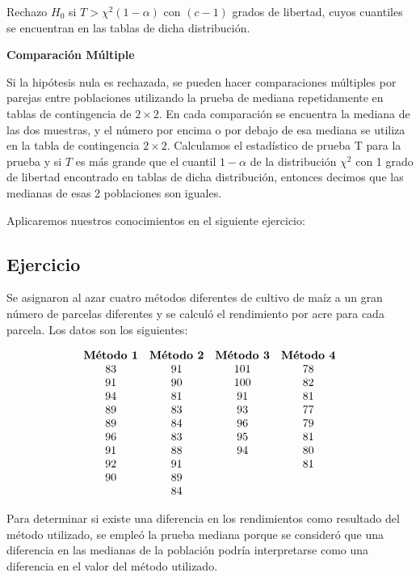 \documentclass[
  a4paper,
  oneside,
  openany]{book}
\begin{document}
Rechazo \(H_0\) si \(T> \chi^2(1-\alpha)\) con \((c-1)\) grados de libertad, cuyos cuantiles se encuentran en las tablas de dicha distribución.

\textbf{Comparación Múltiple}

Si la hipótesis nula es rechazada, se pueden hacer comparaciones múltiples por parejas entre poblaciones utilizando la prueba de mediana repetidamente en tablas de contingencia de \(2 \times 2\). En cada comparación se encuentra la mediana de las dos muestras, y el número por encima o por debajo de esa mediana se utiliza en la tabla de contingencia \(2 \times 2\). Calculamos el estadístico de prueba T para la prueba y si \(T\) es más grande que el cuantil \(1-\alpha\) de la distribución \(\chi^2\) con 1 grado de libertad encontrado en tablas de dicha distribución, entonces decimos que las medianas de esas 2 poblaciones son iguales.

Aplicaremos nuestros conocimientos en el siguiente ejercicio:

\hypertarget{ejercicio-2}{%
\subsection{Ejercicio}\label{ejercicio-2}}

Se asignaron al azar cuatro métodos diferentes de cultivo de maíz a un gran número de parcelas diferentes y se calculó el rendimiento por acre para cada parcela. Los datos son los siguientes:

\[
\begin{array}{ c c c c c } 
\textbf{Método 1} & \textbf{Método 2} & \textbf{Método 3} & \textbf{Método 4} \\ 
83 & 91 &101  &78  \\ 
91 & 90 &100 &82 \\
94 & 81 &91  &81  \\
89 & 83 &93  &77  \\
89 & 84 &96  &79 \\
96 & 83 &95 &81 \\
91 & 88 &94  &80 \\
92 & 91 & & 81 \\
90 & 89 & &  \\
   & 84 &  &  \\
\end{array}
\]

Para determinar si existe una diferencia en los rendimientos como resultado del método utilizado, se empleó la prueba mediana porque se consideró que una diferencia en las medianas de la población podría interpretarse como una diferencia en el valor del método utilizado.
\end{document}
